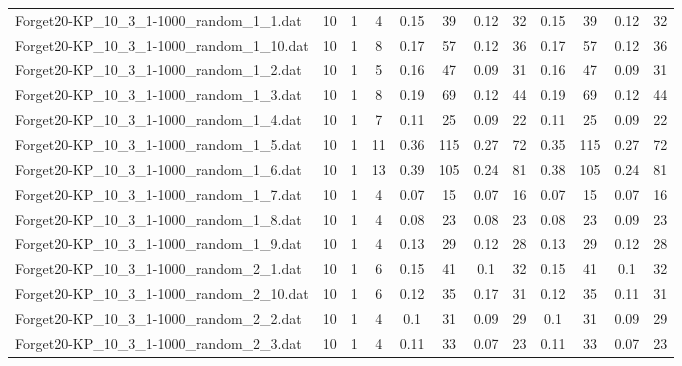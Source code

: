 \begin{sidewaystable}[!ht]
{\begin{tabular}{lccccccccccc}
Forget20-KP\_10\_3\_1-1000\_random\_1\_1.dat & 10 & 1 & 4 & 0.15 & 39 &  \textcolor{blue2}{0.12} & 32 & 0.15 & 39 &  \textcolor{blue2}{0.12} & 32 \\
Forget20-KP\_10\_3\_1-1000\_random\_1\_10.dat & 10 & 1 & 8 & 0.17 & 57 &  \textcolor{blue2}{0.12} & 36 & 0.17 & 57 &  \textcolor{blue2}{0.12} & 36 \\
Forget20-KP\_10\_3\_1-1000\_random\_1\_2.dat & 10 & 1 & 5 & 0.16 & 47 &  \textcolor{blue2}{0.09} & 31 & 0.16 & 47 &  \textcolor{blue2}{0.09} & 31 \\
Forget20-KP\_10\_3\_1-1000\_random\_1\_3.dat & 10 & 1 & 8 & 0.19 & 69 &  \textcolor{blue2}{0.12} & 44 & 0.19 & 69 &  \textcolor{blue2}{0.12} & 44 \\
Forget20-KP\_10\_3\_1-1000\_random\_1\_4.dat & 10 & 1 & 7 & 0.11 & 25 &  \textcolor{blue2}{0.09} & 22 & 0.11 & 25 &  \textcolor{blue2}{0.09} & 22 \\
Forget20-KP\_10\_3\_1-1000\_random\_1\_5.dat & 10 & 1 & 11 & 0.36 & 115 &  \textcolor{blue2}{0.27} & 72 & 0.35 & 115 &  \textcolor{blue2}{0.27} & 72 \\
Forget20-KP\_10\_3\_1-1000\_random\_1\_6.dat & 10 & 1 & 13 & 0.39 & 105 &  \textcolor{blue2}{0.24} & 81 & 0.38 & 105 &  \textcolor{blue2}{0.24} & 81 \\
Forget20-KP\_10\_3\_1-1000\_random\_1\_7.dat & 10 & 1 & 4 &  \textcolor{blue2}{0.07} & 15 &  \textcolor{blue2}{0.07} & 16 &  \textcolor{blue2}{0.07} & 15 &  \textcolor{blue2}{0.07} & 16 \\
Forget20-KP\_10\_3\_1-1000\_random\_1\_8.dat & 10 & 1 & 4 &  \textcolor{blue2}{0.08} & 23 &  \textcolor{blue2}{0.08} & 23 &  \textcolor{blue2}{0.08} & 23 & 0.09 & 23 \\
Forget20-KP\_10\_3\_1-1000\_random\_1\_9.dat & 10 & 1 & 4 & 0.13 & 29 &  \textcolor{blue2}{0.12} & 28 & 0.13 & 29 &  \textcolor{blue2}{0.12} & 28 \\
Forget20-KP\_10\_3\_1-1000\_random\_2\_1.dat & 10 & 1 & 6 & 0.15 & 41 &  \textcolor{blue2}{0.1} & 32 & 0.15 & 41 &  \textcolor{blue2}{0.1} & 32 \\
Forget20-KP\_10\_3\_1-1000\_random\_2\_10.dat & 10 & 1 & 6 & 0.12 & 35 & 0.17 & 31 & 0.12 & 35 &  \textcolor{blue2}{0.11} & 31 \\
Forget20-KP\_10\_3\_1-1000\_random\_2\_2.dat & 10 & 1 & 4 & 0.1 & 31 &  \textcolor{blue2}{0.09} & 29 & 0.1 & 31 &  \textcolor{blue2}{0.09} & 29 \\
Forget20-KP\_10\_3\_1-1000\_random\_2\_3.dat & 10 & 1 & 4 & 0.11 & 33 &  \textcolor{blue2}{0.07} & 23 & 0.11 & 33 &  \textcolor{blue2}{0.07} & 23 \\

\end{tabular}}
\end{sidewaystable}
